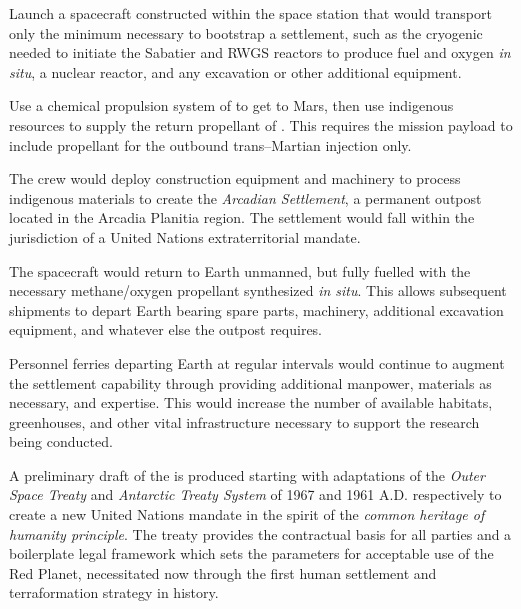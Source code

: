 \item Launch a spacecraft constructed within the space station that would transport only the minimum necessary to bootstrap a settlement, such as the cryogenic  needed to initiate the Sabatier and RWGS reactors to produce fuel and oxygen {\it in situ}, a nuclear reactor, and any excavation or other additional equipment.

\item Use a chemical propulsion system of  to get to Mars, then use indigenous resources to supply the return propellant of . This requires the mission payload to include propellant for the outbound trans--Martian injection only.

\item The crew would deploy construction equipment and machinery to process indigenous materials to create the {\it Arcadian Settlement}, a permanent outpost located in the Arcadia Planitia region. The settlement would fall within the jurisdiction of a United Nations extraterritorial mandate.

\item The spacecraft would return to Earth unmanned, but fully fuelled with the necessary methane/oxygen propellant synthesized {\it in situ}. This allows subsequent shipments to depart Earth bearing spare parts, machinery, additional excavation equipment, and whatever else the outpost requires.

\item Personnel ferries departing Earth at regular intervals would continue to augment the settlement capability through providing additional manpower, materials as necessary, and expertise. This would increase the number of available habitats, greenhouses, and other vital infrastructure necessary to support the research being conducted.
\stopitemize

A preliminary draft of the  is produced starting with adaptations of the {\it Outer Space Treaty} and {\it Antarctic Treaty System} of 1967 and 1961 A.D. respectively to create a new United Nations mandate in the spirit of the {\it common heritage of humanity principle}. The treaty provides the contractual basis for all parties and a boilerplate legal framework which sets the parameters for acceptable use of the Red Planet, necessitated now through the first human settlement and terraformation strategy in history. 

